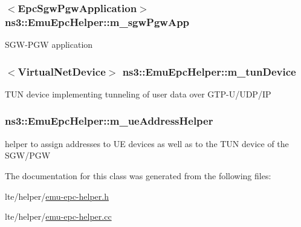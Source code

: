 \subsubsection[{\texorpdfstring{m\+\_\+sgw\+Pgw\+App}{m_sgwPgwApp}}]{$<${\bf Epc\+Sgw\+Pgw\+Application}$>$ ns3\+::\+Emu\+Epc\+Helper\+::m\+\_\+sgw\+Pgw\+App\hspace{0.3cm}{\ttfamily [private]}}\hypertarget{classns3_1_1EmuEpcHelper_a9f3619ec9e8725d4fbb9794a4f21aaa4}{}\label{classns3_1_1EmuEpcHelper_a9f3619ec9e8725d4fbb9794a4f21aaa4}
S\+G\+W-\/\+P\+GW application 
\subsubsection[{\texorpdfstring{m\+\_\+tun\+Device}{m_tunDevice}}]{$<${\bf Virtual\+Net\+Device}$>$ ns3\+::\+Emu\+Epc\+Helper\+::m\+\_\+tun\+Device\hspace{0.3cm}{\ttfamily [private]}}\hypertarget{classns3_1_1EmuEpcHelper_ababd4c0bb2cb44e0194c852e6411b501}{}\label{classns3_1_1EmuEpcHelper_ababd4c0bb2cb44e0194c852e6411b501}
T\+UN device implementing tunneling of user data over G\+T\+P-\/\+U/\+U\+D\+P/\+IP 
\subsubsection[{\texorpdfstring{m\+\_\+ue\+Address\+Helper}{m_ueAddressHelper}}]{ ns3\+::\+Emu\+Epc\+Helper\+::m\+\_\+ue\+Address\+Helper\hspace{0.3cm}{\ttfamily [private]}}\hypertarget{classns3_1_1EmuEpcHelper_ab57fc887c64c3f3aec6516957a84275d}{}\label{classns3_1_1EmuEpcHelper_ab57fc887c64c3f3aec6516957a84275d}
helper to assign addresses to UE devices as well as to the T\+UN device of the S\+G\+W/\+P\+GW 

The documentation for this class was generated from the following files\+:\begin{DoxyCompactItemize}
\item 
lte/helper/\hyperlink{emu-epc-helper_8h}{emu-\/epc-\/helper.\+h}\item 
lte/helper/\hyperlink{emu-epc-helper_8cc}{emu-\/epc-\/helper.\+cc}\end{DoxyCompactItemize}
